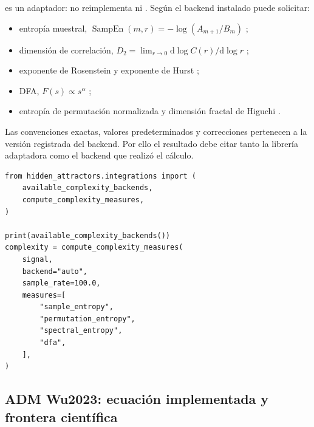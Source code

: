  es un adaptador: no reimplementa
 ni . Según el backend instalado puede
solicitar:
\begin{itemize}
  \item entropía muestral, \(\operatorname{SampEn}(m,r)
  =-\log(A_{m+1}/B_m)\) \cite{RichmanMoorman2000};
  \item dimensión de correlación,
  \(D_2=\lim_{r\to0}\mathrm d\log C(r)/\mathrm d\log r\)
  \cite{GrassbergerProcaccia1983};
  \item exponente de Rosenstein y exponente de Hurst
  \cite{Hurst1951};
  \item DFA, \(F(s)\propto s^\alpha\) \cite{Peng1994};
  \item entropía de permutación normalizada \cite{BandtPompe2002} y
  dimensión fractal de Higuchi \cite{Higuchi1988}.
\end{itemize}
Las convenciones exactas, valores predeterminados y correcciones pertenecen a
la versión registrada del backend. Por ello el resultado debe citar tanto la
librería adaptadora como el backend que realizó el cálculo.

\begin{verbatim}
from hidden_attractors.integrations import (
    available_complexity_backends,
    compute_complexity_measures,
)

print(available_complexity_backends())
complexity = compute_complexity_measures(
    signal,
    backend="auto",
    sample_rate=100.0,
    measures=[
        "sample_entropy",
        "permutation_entropy",
        "spectral_entropy",
        "dfa",
    ],
)
\end{verbatim}

\subsection{ADM Wu2023: ecuación implementada y frontera científica}


